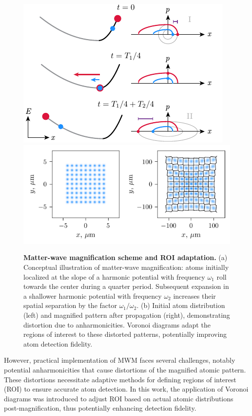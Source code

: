 \begin{figure}
    \centering
    \includegraphics{fig-ai/mwm-scheme.pdf}
    \includegraphics{fig-py/mwm.pdf}
    \caption[Matter-wave magnification scheme and ROI adaptation]{
    \textbf{Matter-wave magnification scheme and ROI adaptation.}
    (a) Conceptual illustration of matter-wave magnification: atoms initially localized at the slope of a harmonic potential with frequency $\omega_1$ roll towards the center during a quarter period. Subsequent expansion in a shallower harmonic potential with frequency $\omega_2$ increases their spatial separation by the factor $\omega_1/\omega_2$.
    (b) Initial atom distribution (left) and magnified pattern after propagation (right), demonstrating distortion due to anharmonicities. Voronoi diagrams adapt the regions of interest to these distorted patterns, potentially improving atom detection fidelity.
    }
    \label{fig:mwm}
\end{figure}

However, practical implementation of MWM faces several challenges, notably potential anharmonicities that cause distortions of the magnified atomic pattern. These distortions necessitate adaptive methods for defining regions of interest (ROI) to ensure accurate atom detection. In this work, the application of Voronoi diagrams was introduced to adjust ROI based on actual atomic distributions post-magnification, thus potentially enhancing detection fidelity.
